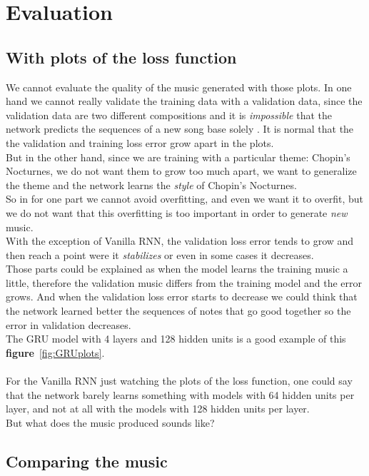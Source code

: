 \documentclass[11pt]
{article}
\begin{document}
\section{Evaluation}

\subsection{With plots of the loss function}
We cannot evaluate the quality of the music generated with those plots.
In one hand we cannot really validate the training data with a validation data, since the validation data are two different compositions and it is \textit{impossible} that the network predicts the sequences of a new song base solely .
It is normal that the the validation and training loss error grow apart in the plots.\\
But in the other hand, since we are training with a particular theme: Chopin's Nocturnes, we do not want them to grow too much apart, we want to generalize the theme and the network learns the \textit{style} of Chopin's Nocturnes.\\
So in for one part we cannot avoid overfitting, and even we want it to overfit, but we do not want that this overfitting is too important in order to generate \textit{new} music.
\\

With the exception of Vanilla RNN, the validation loss error tends to grow and then reach a point were it \textit{stabilizes} or even in some cases it decreases.\\
Those parts could be explained as when the model learns the training music a little, therefore the validation music differs from the training model and the error grows.
And when the validation loss error starts to decrease we could think that the network learned better the sequences of notes that go good together so the error in validation decreases.\\
The GRU model with 4 layers and 128 hidden units is a good example of this \textbf{figure}~\ref{fig:GRUplots}.\\
\\
For the Vanilla RNN just watching the plots of the loss function, one could say that the network barely learns something with models with 64 hidden units per layer, and not at all with the models with 128 hidden units per layer.\\
But what does the music produced sounds like?


\subsection{Comparing the music}
\end{document}
